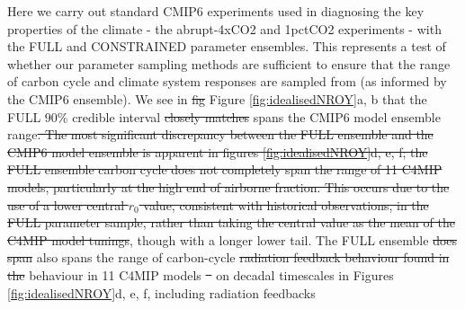\documentclass[gmd, manuscript]{copernicus}
\providecommand{\DIFadd}[1]{{\protect\color{blue}#1}} %
\providecommand{\DIFdel}[1]{{\protect\color{red}\sout{#1}}}                      %
\providecommand{\DIFaddbegin}{} %
\providecommand{\DIFaddend}{} %
\providecommand{\DIFdelbegin}{} %
\providecommand{\DIFdelend}{} %
\begin{document}
Here we carry out standard CMIP6 experiments used in diagnosing the key properties of the climate - the abrupt-4xCO2 and 1pctCO2 experiments - with the FULL and CONSTRAINED parameter ensembles. This represents a test of whether our parameter sampling methods are sufficient to ensure that the range of carbon cycle and climate system responses are sampled from (as informed by the CMIP6 ensemble). We see in \DIFdelbegin \DIFdel{fig }\DIFdelend \DIFaddbegin \DIFadd{Figure }\DIFaddend \ref{fig:idealisedNROY}a, b that the FULL 90\% credible interval \DIFdelbegin \DIFdel{closely matches }\DIFdelend \DIFaddbegin \DIFadd{spans }\DIFaddend the CMIP6 model ensemble range\DIFdelbegin \DIFdel{. The most significant discrepancy between the FULL ensemble and the CMIP6 model ensemble is apparent in figures \ref{fig:idealisedNROY}d, e, f; the FULL ensemble carbon cycle does not completely span the range of 11 C4MIP models, particularly at the high end of airborne fraction. This occurs due to the use of a lower central $r_0$ value, consistent with historical observations, in the FULL parameter sample, rather than taking the central value as the mean of the C4MIP model tunings}\DIFdelend \DIFaddbegin \DIFadd{, though with a longer lower tail}\DIFaddend . The FULL ensemble \DIFdelbegin \DIFdel{does span }\DIFdelend \DIFaddbegin \DIFadd{also spans }\DIFaddend the range of carbon-cycle \DIFdelbegin \DIFdel{radiation feedback behaviour found in the }\DIFdelend \DIFaddbegin \DIFadd{behaviour in 11 }\DIFaddend C4MIP models \DIFdelbegin \DIFdel{\mbox{%
\citep[fig \ref{fig:idealisedNROY}g]{Arora2019}}\hspace{0pt}%
}\DIFdelend \DIFaddbegin \DIFadd{on decadal timescales in Figures \ref{fig:idealisedNROY}d, e, f, including radiation feedbacks \mbox{%
\citep[Figure \ref{fig:idealisedNROY}g]{K.Arora2020}}\hspace{0pt}%
}
\end{document}
